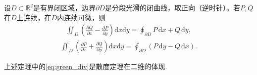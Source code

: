 \documentclass[../../main.tex]{subfiles}%
\begin{document}
\begin{theorem}\label{theorem:Green公式平面散度定理与旋度定理}
设$D\subset\mathbb{R}^2$是有界闭区域，边界$\partial D$是分段光滑的闭曲线，取正向（逆时针）。若$P,Q$在$\overline{D}$上连续，在$D$内连续可微，则
\begin{align*}
\iint_{D}\left(\frac{\partial Q}{\partial x}-\frac{\partial P}{\partial y}\right)\mathrm{d}x\mathrm{d}y=\oint_{\partial D}P\,\mathrm{d}x+Q\,\mathrm{d}y, 
\end{align*}
\begin{align}
\iint_{D}\left(\frac{\partial P}{\partial x}+\frac{\partial Q}{\partial y}\right)\mathrm{d}x\mathrm{d}y=\oint_{\partial D}(P\,\mathrm{d}y-Q\,\mathrm{d}x).\label{eq:green_div} 
\end{align}
\end{theorem}
\begin{remark}
上述定理中的\eqref{eq:green_div}是散度定理在二维的体现.
\end{remark}
\end{document}
